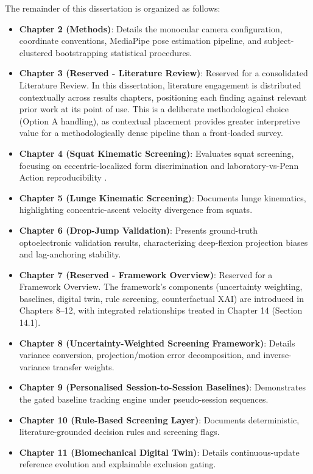 The remainder of this dissertation is organized as follows:
\begin{itemize}
  \item \textbf{Chapter 2 (Methods)}: Details the monocular camera configuration, coordinate conventions, MediaPipe pose estimation pipeline, and subject-clustered bootstrapping statistical procedures.
  \item \textbf{Chapter 3 (Reserved - Literature Review)}: Reserved for a consolidated Literature Review. In this dissertation, literature engagement is distributed contextually across results chapters, positioning each finding against relevant prior work at its point of use. This is a deliberate methodological choice (Option A handling), as contextual placement provides greater interpretive value for a methodologically dense pipeline than a front-loaded survey.
  \item \textbf{Chapter 4 (Squat Kinematic Screening)}: Evaluates squat screening, focusing on eccentric-localized form discrimination and laboratory-vs-Penn Action reproducibility \citep{Zhang_Penn_Action_2013}.
  \item \textbf{Chapter 5 (Lunge Kinematic Screening)}: Documents lunge kinematics, highlighting concentric-ascent velocity divergence from squats.
  \item \textbf{Chapter 6 (Drop-Jump Validation)}: Presents ground-truth optoelectronic validation results, characterizing deep-flexion projection biases and lag-anchoring stability.
  \item \textbf{Chapter 7 (Reserved - Framework Overview)}: Reserved for a Framework Overview. The framework's components (uncertainty weighting, baselines, digital twin, rule screening, counterfactual XAI) are introduced in Chapters 8–12, with integrated relationships treated in Chapter 14 (Section 14.1).
  \item \textbf{Chapter 8 (Uncertainty-Weighted Screening Framework)}: Details variance conversion, projection/motion error decomposition, and inverse-variance transfer weights.
  \item \textbf{Chapter 9 (Personalised Session-to-Session Baselines)}: Demonstrates the gated baseline tracking engine under pseudo-session sequences.
  \item \textbf{Chapter 10 (Rule-Based Screening Layer)}: Documents deterministic, literature-grounded decision rules and screening flags.
  \item \textbf{Chapter 11 (Biomechanical Digital Twin)}: Details continuous-update reference evolution and explainable exclusion gating.

\end{itemize}
